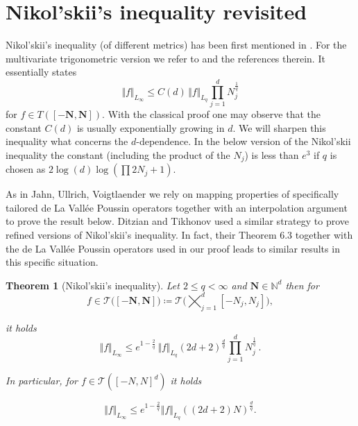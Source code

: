 \documentclass[11pt,reqno]{article}
\numberwithin{equation}{section}
\theoremstyle{definition}
\theoremstyle{plain}
\newtheorem{theorem}[satz]{Theorem}
\newcommand{\N}{\ensuremath{\mathbb{N}}}
\newcommand{\bN}{\ensuremath{\mathbf N}}
\newcommand{\be}{\begin{equation}}
\newcommand{\ee}{\end{equation}}
\begin{document}
\section{Nikol'skii's inequality revisited}
Nikol'skii's inequality (of different metrics) has been first mentioned in \cite[Eq.\ 2.4]{Nik51}. For the multivariate trigonometric version we refer to \cite[Thm.\ 2.4.5]{DuTeUl18} and the references therein. It essentially states
\be \label{Niko_original}
\Vert f \Vert_{L_\infty} \leq C(d)\,\Vert f \Vert_{L_q} \prod_{j=1}^d N_j^{\frac{1}{q}}
\ee
for $f \in T([-\bN, \bN])$. With the classical proof one may observe that the constant $C(d)$ is usually exponentially growing in $d$. We will sharpen this inequality what concerns the $d$-dependence. In the below version of the Nikol'skii inequality the constant (including the product of the \(N_j\)) is less than $e^3$ if $q$ is chosen as $2 \log(d)\log(\prod 2 N_j +1)$.


As in Jahn, Ullrich, Voigtlaender \cite{JUV23} we rely on mapping properties of specifically tailored de La Vall{\'e}e Poussin operators together with an interpolation argument to prove the result below. Ditzian and Tikhonov \cite{DT05} used a similar strategy to prove refined versions of Nikol'skii's inequality. In fact, their Theorem 6.3 together with the de La Vall{\'e}e Poussin operators used in our proof leads to similar results in this specific situation.

\begin{theorem}[Nikol'skii's inequality] \label{Niko}
Let \(2 \leq q < \infty\) and \(\bN \in \N^d \) then for
\[f\in \mathcal{T}\big([-\bN,\bN]\big) \coloneqq \mathcal{T}\big(\bigtimes_{j =1}^d [-N_j,N_j]\big),\]

\noindent it holds
\be
\Vert f \Vert_{L_\infty} \leq e^{1-\frac{2}{q}} \, \Vert f \Vert_{L_q} (2d+2)^{\frac{d}{q}} \prod_{j=1}^d N_j^{\frac{1}{q}}\,.
\ee

\noindent In particular, for \(f \in \mathcal{T}([-N,N]^d)\) it holds


\[\Vert f \Vert_{L_\infty} \leq e^{1-\frac{2}{q}}  \Vert f \Vert_{L_q}\left((2d+2)N\right)^{\frac{d}{q}}.\]

\end{theorem}
\end{document}
